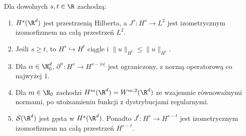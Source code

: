 \begin{twierdzenie}
\label{thm:pde8-Hs}
Dla dowolnych $s,t\in\R$ zachodzą:
\begin{enumerate}
\item $H^s(\R^d)$ jest przestrzenią Hilberta, a
 $J^s:H^s\to L^2$ jest izometrycznym izomorfizmem
 na całą przestrzeń $L^2$.
\item Jeśli $s\ge t$, to $H^s\hookrightarrow H^t$
 ciągle i $\|u\|_{H^t}\le\|u\|_{H^s}$.
\item Dla $\alpha\in\N_0^d$, $\partial^\alpha:H^s\to
 H^{s-|\alpha|}$ jest ograniczony, z normą
 operatorową co najwyżej $1$.
\item Dla $m\in\N_0$ zachodzi $H^m(\R^d)=W^{m,2}(\R^d)$
 ze wzajemnie równoważnymi normami, po utożsamieniu
 funkcji z dystrybucjami regularnymi.
\item $\mathcal S(\R^d)$ jest gęsta w $H^s(\R^d)$.
 Ponadto $J^t:H^s\to H^{s-t}$ jest izometrycznym
 izomorfizmem na całą przestrzeń $H^{s-t}$.
\end{enumerate}
\end{twierdzenie}
